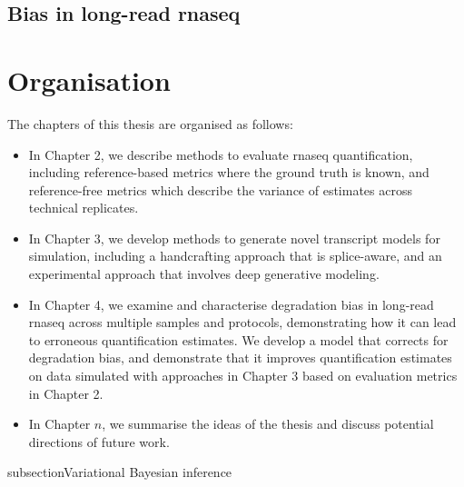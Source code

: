 \subsection{Bias in long-read \gls{rnaseq}}

\lipsum[3]

\section{Organisation}

The chapters of this thesis are organised as follows:
\begin{itemize}
    \item In Chapter 2, we describe methods to evaluate \gls{rnaseq} quantification, including reference-based metrics where the ground truth is known, and reference-free metrics which describe the variance of estimates across technical replicates. 
    \item In Chapter 3, we develop methods to generate novel transcript models for simulation, including a handcrafting approach that is splice-aware, and an experimental approach that involves deep generative modeling.
    \item In Chapter 4, we examine and characterise degradation bias in long-read \gls{rnaseq} across multiple samples and protocols, demonstrating how it can lead to erroneous quantification estimates. We develop a model that corrects for degradation bias, and demonstrate that it improves quantification estimates on data simulated with approaches in Chapter 3 based on evaluation metrics in Chapter 2. 
    \item In Chapter $n$, we summarise the ideas of the thesis and discuss potential directions of future work. 
\end{itemize}

subsection{Variational Bayesian inference}


